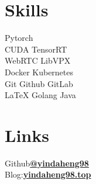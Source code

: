 \documentclass[]{deedy-resume-openfont}
\begin{document}
\begin{minipage}[t]{0.22\textwidth}
\section{Skills}
Pytorch \\
CUDA \textbullet{} TensorRT \\
WebRTC \textbullet{} LibVPX \\
Docker \textbullet{} Kubernetes \\
Git \textbullet{} Github \textbullet{} GitLab \\
\LaTeX \textbullet{} Golang \textbullet{} Java \\

\section{Links}
Github\href{https://github.com/yindaheng98}{\bf @yindaheng98} \\
Blog:\href{http://www.yindaheng98.top}{\bf yindaheng98.top} \\
\sectionsep

\end{minipage} 
\hfill
\end{document}
